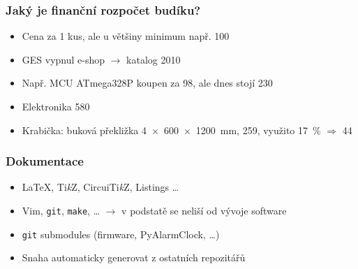 \documentclass[
    utf8,
    aspectratio=169,
    17pt,  %
]{beamer}
\def\TikZ{Ti\emph{k}Z}
\def\Circuitikz{Circui\TikZ}
\begin{document}
\begin{frame}
    \frametitle{Jaký je finanční rozpočet budíku?}
    \begin{itemize}
        \item Cena za 1 kus, ale u většiny minimum např. \SI{100}{\ks}
        \item GES vypnul e-shop $\rightarrow$ katalog 2010
        \item Např. MCU ATmega328P koupen za \SI{98}{\Kc}, ale dnes stojí
            \SI{230}{\Kc}
        \vspace{5mm}
        \item Elektronika \SI{580}{\Kc}
        \item Krabička: buková překližka
            \SI[product-units=single]{4x600x1200}{\milli\meter},
            \SI{259}{\Kc}, využito \SI{17}{\percent} $\Rightarrow$ \SI{44}{\Kc}
    \end{itemize}
\end{frame}



\begin{frame}
    \frametitle{Dokumentace}
    \begin{itemize}
        \item {\rmfamily\LaTeX{}}, {\rmfamily\TikZ{}},
            {\rmfamily\Circuitikz{}}, Listings \ldots
        \item Vim, \texttt{git}, \texttt{make}, \ldots
            $\rightarrow$ v podstatě se neliší od vývoje software
        \item \texttt{git} submodules (firmware, PyAlarmClock, \ldots)
        \item Snaha automaticky generovat z ostatních repozitářů
    \end{itemize}
\end{frame}
\end{document}
